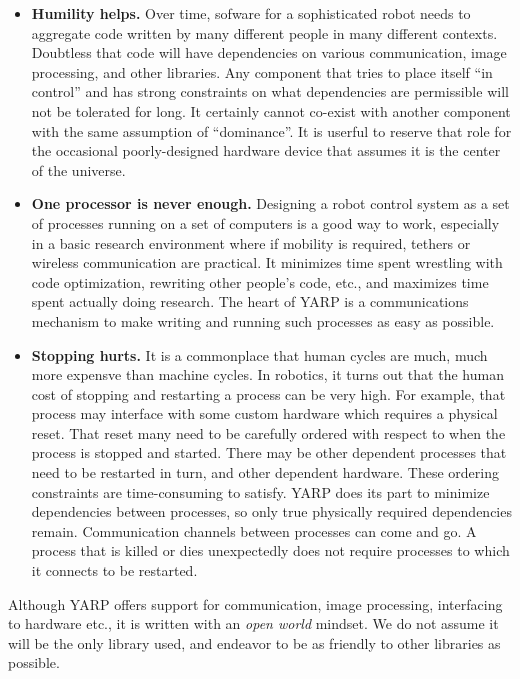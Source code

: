 \begin{itemize} \pflist

\item {\bf Humility helps.}
%
Over time, sofware for a sophisticated robot needs to 
aggregate code written by many different people in many
different contexts.  Doubtless that code will have
dependencies on various communication, image processing,
and other libraries.
%
Any component that tries to place itself ``in control'' and has strong
constraints on what dependencies are permissible will not be tolerated
for long.  It certainly cannot co-exist with another component
with the same assumption of ``dominance''.  It is userful to reserve
that role for the occasional poorly-designed hardware device that
assumes it is the center of the universe.



\item {\bf One processor is never enough.}
%
Designing a robot control system as a set of processes running on a
set of computers is a good way to work, especially in a basic research
environment where if mobility is required, tethers or wireless
communication are practical.  It minimizes time spent wrestling with
code optimization, rewriting other people's code, etc., and maximizes
time spent actually doing research.  The heart of YARP is a
communications mechanism to make writing and running such processes as
easy as possible.


\item {\bf Stopping hurts.}
%
It is a commonplace that human cycles are much, much more expensve
than machine cycles.  In robotics, it turns out that the human
cost of stopping and restarting a process can be very high.
For example, that process may interface with some
custom hardware which requires a physical reset.  
That reset many need to be carefully ordered with respect to when the
process is stopped and started.
%
There may be other dependent processes that need to be restarted in
turn, and other dependent hardware.
%
These ordering constraints are time-consuming to satisfy.
%
YARP does its part to minimize dependencies between processes, so only
true physically required dependencies remain.  Communication channels
between processes can come and go.  A process that is killed or dies
unexpectedly does not require processes to which it connects to be
restarted.


\end{itemize}



\noindent
Although YARP offers support for communication, image processing,
interfacing to hardware etc., it is written with an {\em open world}
mindset.  We do not assume it will be the only library used, and
endeavor to be as friendly to other libraries as possible.

